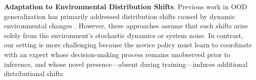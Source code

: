 


\textbf{Adaptation to Environmental Distribution Shifts}.
Previous work in OOD generalization has primarily addressed distribution shifts caused by dynamic environmental changes \citep{danesh2021out, liu2021towards, paudel2022learning, haider2023out, yang2024generalized, nasvytis2024rethinking}. However, these approaches assume that such shifts arise solely from the environment's stochastic dynamics or system noise. In contrast, our setting is more challenging because the novice policy must learn to coordinate with an expert whose decision-making process remains unobserved prior to inference, and whose novel presence—absent during training—induces additional distributional shifts.











